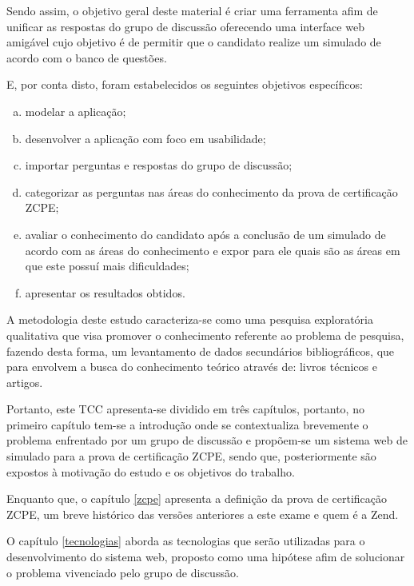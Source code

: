 
Sendo assim, o objetivo geral deste material é criar uma ferramenta afim de
unificar as respostas do grupo de discussão oferecendo uma interface web
amigável cujo objetivo é de permitir que o candidato realize um simulado de
acordo com o banco de questões.


E, por conta disto, foram estabelecidos os seguintes objetivos
específicos:

\begin{enumerate}[a)]
    \item modelar a aplicação;
    \item desenvolver a aplicação com foco em usabilidade;
    \item importar perguntas e respostas do grupo de discussão;
    \item categorizar as perguntas nas áreas do conhecimento da prova de
    certificação \acs{ZCPE};
    \item avaliar o conhecimento do candidato após a conclusão de um simulado 
    de acordo com as áreas do conhecimento e expor para ele quais são as áreas  em
    que este possuí mais dificuldades;
    \item apresentar os resultados obtidos.
\end{enumerate}


A metodologia deste estudo caracteriza-se como uma pesquisa exploratória
qualitativa que visa promover o conhecimento referente ao problema de pesquisa, fazendo desta forma,
um levantamento de dados secundários bibliográficos, que para
 envolvem a busca do conhecimento 
teórico através de: livros técnicos e artigos.

Portanto, este TCC apresenta-se dividido em três capítulos, portanto, no
primeiro capítulo tem-se a introdução onde se contextualiza brevemente o problema
enfrentado por um grupo de discussão e propõem-se um sistema web de
simulado para a prova de certificação \acs{ZCPE}, sendo que, posteriormente são
expostos à motivação do estudo e os objetivos do trabalho.

Enquanto que, o capítulo \ref{zcpe} apresenta a definição da prova de
certificação \acl{ZCPE}, um breve histórico das versões anteriores a este
exame e quem é a \acs{Zend}.

O capítulo \ref{tecnologias} aborda as tecnologias que serão utilizadas para o
desenvolvimento do sistema web, proposto como uma hipótese afim de solucionar
o problema vivenciado pelo grupo de discussão.


